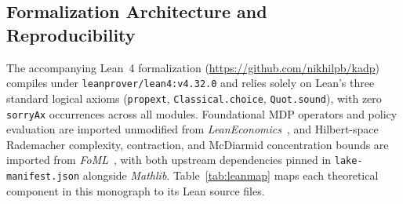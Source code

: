 \documentclass[11pt,letterpaper]{article}
\theoremstyle{definition}
\begin{document}
\subsection{Formalization Architecture and Reproducibility}
\label{sec:repro}

The accompanying Lean~4 formalization (\url{https://github.com/nikhilpb/kadp}) compiles under \nolinkurl{leanprover/lean4:v4.32.0} and relies solely on Lean's three standard logical axioms (\nolinkurl{propext}, \nolinkurl{Classical.choice}, \nolinkurl{Quot.sound}), with zero \nolinkurl{sorryAx} occurrences across all modules. Foundational MDP operators and policy evaluation are imported unmodified from \emph{LeanEconomics}~\cite{LeanEconomics}, and Hilbert-space Rademacher complexity, contraction, and McDiarmid concentration bounds are imported from \emph{FoML}~\cite{FoML}, with both upstream dependencies pinned in \nolinkurl{lake-manifest.json} alongside \emph{Mathlib}. Table~\ref{tab:leanmap} maps each theoretical component in this monograph to its Lean source files.
\end{document}

